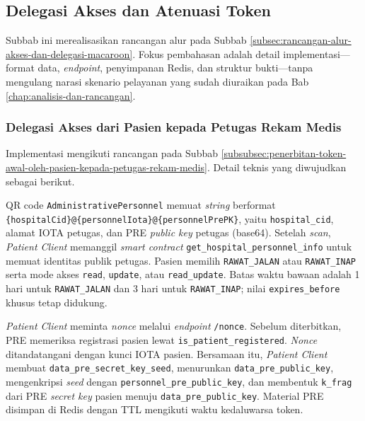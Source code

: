 \subsection{Delegasi Akses dan Atenuasi Token}
\label{subsec:implementasi-atenuasi-offline-delegasi}


Subbab ini merealisasikan rancangan alur pada Subbab \ref{subsec:rancangan-alur-akses-dan-delegasi-macaroon}. Fokus pembahasan adalah detail implementasi---format data, \textit{endpoint}, penyimpanan Redis, dan struktur bukti---tanpa mengulang narasi skenario pelayanan yang sudah diuraikan pada Bab \ref{chap:analisis-dan-rancangan}.

\subsubsection{Delegasi Akses dari Pasien kepada Petugas Rekam Medis}
\label{subsubsec:delegasi-akses-dari-pasien-kepada-petugas-rekam-medis}

Implementasi mengikuti rancangan pada Subbab \ref{subsubsec:penerbitan-token-awal-oleh-pasien-kepada-petugas-rekam-medis}. Detail teknis yang diwujudkan sebagai berikut.

QR code \texttt{AdministrativePersonnel} memuat \textit{string} berformat \verb|{hospitalCid}@{personnelIota}@{personnelPrePK}|, yaitu \texttt{hospital\_cid}, alamat IOTA petugas, dan PRE \textit{public key} petugas (base64). Setelah \textit{scan}, \textit{Patient Client} memanggil \textit{smart contract} \verb|get_hospital_personnel_info| untuk memuat identitas publik petugas. Pasien memilih \texttt{RAWAT\_JALAN} atau \texttt{RAWAT\_INAP} serta mode akses \texttt{read}, \texttt{update}, atau \texttt{read\_update}. Batas waktu bawaan adalah 1 hari untuk \texttt{RAWAT\_JALAN} dan 3 hari untuk \texttt{RAWAT\_INAP}; nilai \texttt{expires\_before} khusus tetap didukung.

\textit{Patient Client} meminta \textit{nonce} melalui \textit{endpoint} \texttt{/nonce}. Sebelum diterbitkan, PRE memeriksa registrasi pasien lewat \verb|is_patient_registered|. \textit{Nonce} ditandatangani dengan kunci IOTA pasien. Bersamaan itu, \textit{Patient Client} membuat \texttt{data\_pre\_secret\_key\_seed}, menurunkan \texttt{data\_pre\_public\_key}, mengenkripsi \textit{seed} dengan \texttt{personnel\_pre\_public\_key}, dan membentuk \texttt{k\_frag} dari PRE \textit{secret key} pasien menuju \texttt{data\_pre\_public\_key}. Material PRE disimpan di Redis dengan TTL mengikuti waktu kedaluwarsa token.

